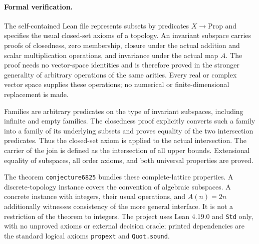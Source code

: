 \documentclass[10pt]{article}
\begin{document}
\paragraph{Formal verification.}
The self-contained Lean file represents subsets by predicates $X\to
\mathrm{Prop}$ and specifies the usual closed-set axioms of a topology.
An invariant subspace carries proofs of closedness, zero membership,
closure under the actual addition and scalar multiplication operations,
and invariance under the actual map $A$. The proof needs no vector-space
identities and is therefore proved in the stronger generality of arbitrary
operations of the same arities. Every real or complex vector space supplies
these operations; no numerical or finite-dimensional replacement is made.

Families are arbitrary predicates on the type of invariant subspaces,
including infinite and empty families. The closedness proof explicitly
converts such a family into a family of its underlying subsets and proves
equality of the two intersection predicates. Thus the closed-set axiom is
applied to the actual intersection. The carrier of the join is defined as
the intersection of all upper bounds. Extensional equality of subspaces,
all order axioms, and both universal properties are proved.

The theorem \texttt{conjecture6825} bundles these complete-lattice
properties. A discrete-topology instance covers the convention of
algebraic subspaces. A concrete instance with integers, their usual
operations, and $A(n)=2n$ additionally witnesses consistency of the more
general interface. It is not a restriction of the theorem to integers.
The project uses Lean 4.19.0 and \texttt{Std} only, with no unproved
axioms or external decision oracle; printed dependencies are the standard
logical axioms \texttt{propext} and \texttt{Quot.sound}.
\end{document}
